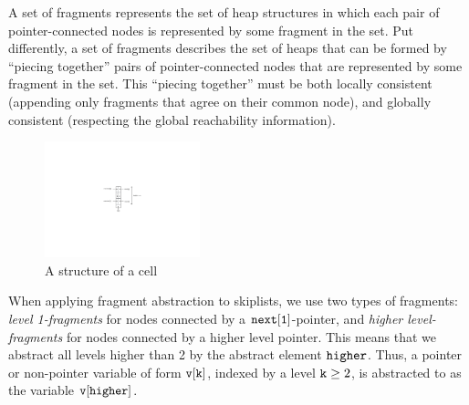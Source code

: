 A set of fragments represents the set of heap
structures in which each pair of pointer-connected nodes is represented by some
fragment in the set.
Put differently, a set of fragments describes the set of heaps that can be formed by
``piecing together'' pairs of pointer-connected nodes that are represented
by some fragment in the set. This ``piecing together'' must
be both locally consistent (appending only fragments that agree on their
common node), and globally consistent (respecting the global reachability
information).
\begin{figure} 
\vspace{-30pt}
  \begin{center}
 \includegraphics[width=0.4\textwidth, trim={13cm 10cm 12cm 9cm}, clip]{skipcell.pdf}  
    \caption{A structure of a cell}
    \label{skipcell}
  \end{center}
  \vspace{-40pt}
  \vspace{1pt}
\end{figure}
When applying fragment abstraction to skiplists, we  use two types of fragments:
{\em level 1-fragments} for
nodes connected by a $\tt next[1]$-pointer, and {\em higher level-fragments} for
nodes connected by a higher level pointer. This means that we abstract all levels
higher than 2 by the abstract element $\tt higher$. Thus, a pointer or
non-pointer variable of form $\tt v[k]$, indexed by a level ${\tt k} \geq 2$, is
abstracted to as the variable $\tt v[higher]$.

